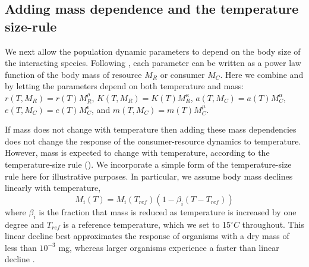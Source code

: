 \documentclass[11pt]{article}
\begin{document}
\subsection*{Adding mass dependence and the temperature size-rule}

We next allow the population dynamic parameters to depend on the body size of the interacting species.
Following \cite{DeLong2015}, each parameter can be written as a power law function of the body mass of resource $M_R$ or consumer $M_C$.
Here we combine \cite{DeLong2015} and \cite{Gilbert2014} by letting the parameters depend on both temperature and mass: $r(T, M_R) = r(T) M_R^\rho$, $K(T, M_R) = K(T) M_R^\kappa$, $a(T, M_C) = a(T) M_C^\alpha$, $e(T, M_C) = e(T) M_C^\epsilon$, and $m(T, M_C) = m(T) M_C^\mu$.

If mass does not change with temperature then adding these mass dependencies does not change the response of the consumer-resource dynamics to temperature.
However, mass is expected to change with temperature, according to the temperature-size rule (\cite{Atkinson1994}).
We incorporate a simple form of the temperature-size rule here for illustrative purposes.
In particular, we assume body mass declines linearly with temperature, \[M_i(T) = M_i(T_{ref}) (1 - \beta_i (T - T_{ref})) \]
where $\beta_i$ is the fraction that mass is reduced as temperature is increased by one degree and $T_{ref}$ is a reference temperature, which we set to 15$^\circ C$ throughout.
This linear decline best approximates the response of organisms with a dry mass of less than $10^{-3}$ mg, whereas larger organisms experience a faster than linear decline \citep{Forster2012}.
\end{document}
